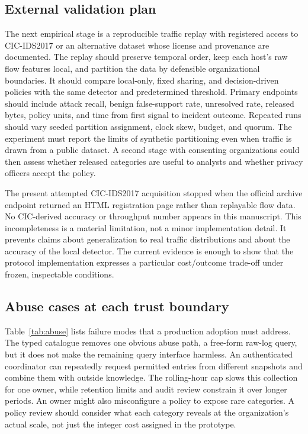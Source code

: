\documentclass[conference,letterpaper]{IEEEtran}
\begin{document}
\subsection{External validation plan}
The next empirical stage is a reproducible traffic replay with registered access to CIC-IDS2017 or an alternative dataset whose license and provenance are documented. The replay should preserve temporal order, keep each host's raw flow features local, and partition the data by defensible organizational boundaries. It should compare local-only, fixed sharing, and decision-driven policies with the same detector and predetermined threshold. Primary endpoints should include attack recall, benign false-support rate, unresolved rate, released bytes, policy units, and time from first signal to incident outcome. Repeated runs should vary seeded partition assignment, clock skew, budget, and quorum. The experiment must report the limits of synthetic partitioning even when traffic is drawn from a public dataset. A second stage with consenting organizations could then assess whether released categories are useful to analysts and whether privacy officers accept the policy.

The present attempted CIC-IDS2017 acquisition stopped when the official archive endpoint returned an HTML registration page rather than replayable flow data. No CIC-derived accuracy or throughput number appears in this manuscript. This incompleteness is a material limitation, not a minor implementation detail. It prevents claims about generalization to real traffic distributions and about the accuracy of the local detector. The current evidence is enough to show that the protocol implementation expresses a particular cost/outcome trade-off under frozen, inspectable conditions.

\subsection{Abuse cases at each trust boundary}
Table~\ref{tab:abuse} lists failure modes that a production adoption must address. The typed catalogue removes one obvious abuse path, a free-form raw-log query, but it does not make the remaining query interface harmless. An authenticated coordinator can repeatedly request permitted entries from different snapshots and combine them with outside knowledge. The rolling-hour cap slows this collection for one owner, while retention limits and audit review constrain it over longer periods. An owner might also misconfigure a policy to expose rare categories. A policy review should consider what each category reveals at the organization's actual scale, not just the integer cost assigned in the prototype.
\end{document}
